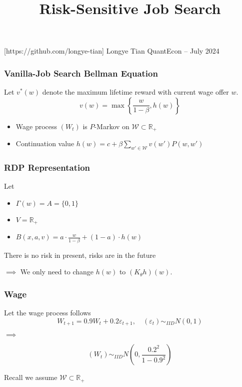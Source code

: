 \documentclass[11pt,xcolor={dvipsnames},hyperref={pdftex,pdfpagemode=UseNone,hidelinks,pdfdisplaydoctitle=true},usepdftitle=false]{beamer}
\begin{document}
\title{Risk-Sensitive Job Search}

\information
%
[https://github.com/longye-tian]
%
{Longye Tian}
%
{QuantEcon -- July 2024}

\frame{\titlepage}


\begin{frame}
\frametitle{Vanilla-Job Search Bellman Equation}

Let $v^*(w)$ denote the maximum lifetime reward with current wage offer $w$.
$$
v (w) = \max\left\{\frac{w}{1-\beta}, h(w)\right\}
$$

\begin{itemize}
\item Wage process $(W_t)$ is $P$-Markov on $\mathcal{W} \subset \mathbb{R}_+$\\
\item Continuation value $h(w) =  c+\beta \sum_{w'\in \mathcal{W}} v(w') P(w,w')$
\end{itemize}
\end{frame}

\begin{frame}
\frametitle{RDP Representation}
Let
\begin{itemize}
\item $\Gamma (w) = A = \{0,1\}$
\item $V = \mathbb{R}_+$
\item $B(x,a,v) = a\cdot \frac{w}{1-\beta} + (1-a)\cdot h(w)$
\end{itemize}

There is no risk in present, risks are in the future

$\implies$ We only need to change $h(w)$ to $(K_\theta h)(w)$.
\end{frame}

\begin{frame}
\end{frame}

\begin{frame}
\frametitle{Wage}
Let the wage process follows 
$$
W_{t+1} = 0.9 W_t + 0.2 \varepsilon_{t+1}, \quad (\varepsilon_t)\sim_{IID} N(0,1)
$$

$\implies$

$$
(W_t) \sim_{IID} N\left(0, \frac{0.2^2}{1-0.9^2}\right)
$$

Recall we assume $\mathcal{W}\subset\mathbb{R}_+$

\end{frame}
\end{document}

